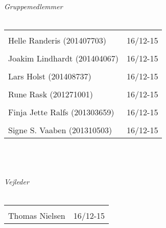 \begin{vplace}[0.6]
{\large \textit{Gruppemedlemmer}}
\\
\\

\noindent \begin{tabular}{ll}
	\makebox[3.0in]{\hrulefill} & \makebox[1.5in]{\hrulefill}\\
	Helle Randeris (201407703) & 16/12-15\\[8ex]%
	\makebox[3in]{\hrulefill} & \makebox[1.5in]{\hrulefill}\\
	Joakim Lindhardt (201404067) & 16/12-15\\[8ex]
	\makebox[3in]{\hrulefill} & \makebox[1.5in]{\hrulefill}\\
	Lars Holst (201408737) & 16/12-15\\[8ex]
	\makebox[3in]{\hrulefill} & \makebox[1.5in]{\hrulefill}\\
	Rune Rask (201271001) & 16/12-15\\[8ex]
	\makebox[3in]{\hrulefill} & \makebox[1.5in]{\hrulefill}\\
	Finja Jette Ralfs (201303659) & 16/12-15\\[8ex]
	\makebox[3in]{\hrulefill} & \makebox[1.5in]{\hrulefill}\\
	Signe S. Vaaben (201310503) & 16/12-15\\[8ex]
\end{tabular}
\\
\\
\\
{\large \textit{Vejleder}}
\\
\\
  
\noindent \begin{tabular}{ll}
	\makebox[3.0in]{\hrulefill} & \makebox[1.5in]{\hrulefill}\\
	Thomas Nielsen & 16/12-15\\[8ex]
\end{tabular}
\end{vplace}

